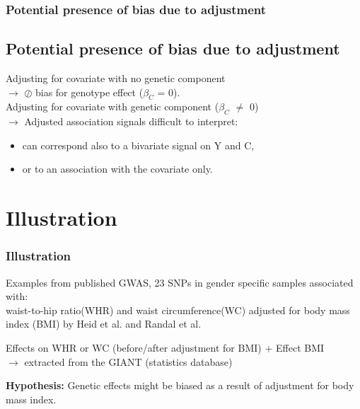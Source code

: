 \documentclass{beamer}
\begin{document}
\begin{frame}
\frametitle{Potential presence of bias due to adjustment }
\subsection{Potential presence of bias due to adjustment}
\begin{block}{}
Adjusting for covariate with no genetic component \\\hspace{0.5cm}
$\rightarrow$  $\oslash$ bias for genotype effect ($\beta_{C}$ = 0).\\\vspace{0.5cm}
Adjusting for covariate with genetic component ($\beta_{C}$ $\neq$ 0)\\\hspace{0.5cm}
$\rightarrow$ Adjusted association signals difficult to interpret:\\
\begin{itemize}
\item can correspond also to a bivariate signal on Y and C,
\item or to an association with the covariate only. 
\end{itemize}

\end{block}

\end{frame}


\section{Illustration}

\begin{frame}
\frametitle{Illustration}
Examples from published GWAS, 23 SNPs in gender specific samples associated with:\\\hspace{0.3cm}
waist-to-hip ratio(WHR) and waist circumference(WC) adjusted for body mass index (BMI) by Heid et al. and Randal et al.\\\vspace{0.3cm}

Effects on WHR or WC (before/after adjustment for BMI) $+$ Effect BMI \\
\hspace{0.5cm}$\rightarrow$ extracted from the GIANT (statistics database)\\\vspace{0.3cm}

\textbf{Hypothesis:} Genetic effects might be biased as a result of adjustment for body mass index.
 
\end{frame}
\end{document}
